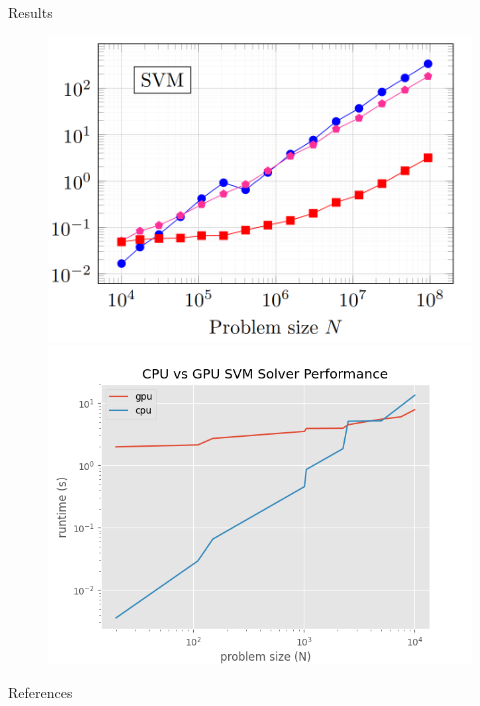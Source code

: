\documentclass[10pt]{beamer}
\begin{document}
\begin{frame}[fragile]{Results}
  \begin{figure}
    \includegraphics[width=.5\textwidth]{./media/cuosqp_results.png}%
\includegraphics[width=.5\textwidth]{./media/results.png}
  \end{figure}
\end{frame}



\begin{frame}[fragile]{References}

  
  

\end{frame}
\end{document}
